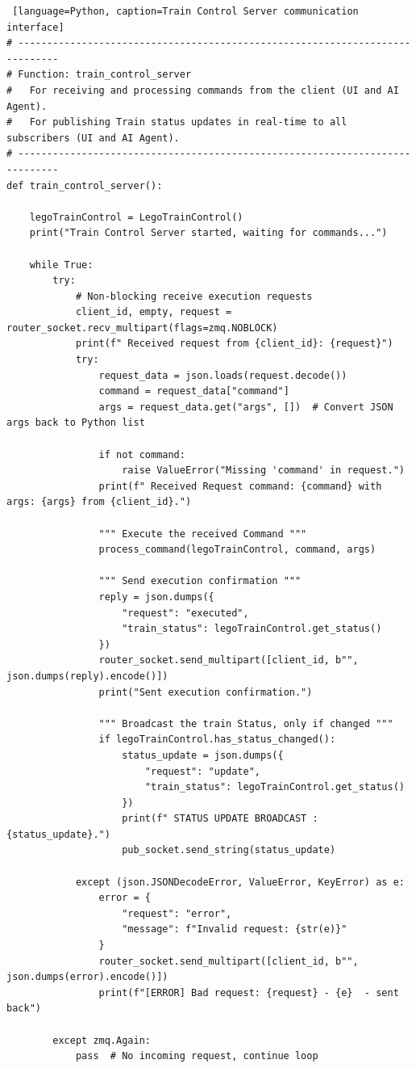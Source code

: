 \begin{lstlisting} [language=Python, caption=Train Control Server communication interface]
# -----------------------------------------------------------------------------
# Function: train_control_server
#   For receiving and processing commands from the client (UI and AI Agent).
#   For publishing Train status updates in real-time to all subscribers (UI and AI Agent).
# -----------------------------------------------------------------------------
def train_control_server():

    legoTrainControl = LegoTrainControl()
    print("Train Control Server started, waiting for commands...")

    while True:
        try:
            # Non-blocking receive execution requests
            client_id, empty, request = router_socket.recv_multipart(flags=zmq.NOBLOCK)
            print(f" Received request from {client_id}: {request}")
            try:
                request_data = json.loads(request.decode())
                command = request_data["command"]
                args = request_data.get("args", [])  # Convert JSON args back to Python list

                if not command:
                    raise ValueError("Missing 'command' in request.")
                print(f" Received Request command: {command} with args: {args} from {client_id}.")

                """ Execute the received Command """
                process_command(legoTrainControl, command, args)

                """ Send execution confirmation """
                reply = json.dumps({
                    "request": "executed",
                    "train_status": legoTrainControl.get_status()
                })
                router_socket.send_multipart([client_id, b"", json.dumps(reply).encode()])
                print("Sent execution confirmation.")

                """ Broadcast the train Status, only if changed """
                if legoTrainControl.has_status_changed():
                    status_update = json.dumps({
                        "request": "update",
                        "train_status": legoTrainControl.get_status()
                    })
                    print(f" STATUS UPDATE BROADCAST : {status_update}.")
                    pub_socket.send_string(status_update)

            except (json.JSONDecodeError, ValueError, KeyError) as e:
                error = {
                    "request": "error",
                    "message": f"Invalid request: {str(e)}"
                }
                router_socket.send_multipart([client_id, b"", json.dumps(error).encode()])
                print(f"[ERROR] Bad request: {request} - {e}  - sent back")

        except zmq.Again:
            pass  # No incoming request, continue loop

\end{lstlisting}

